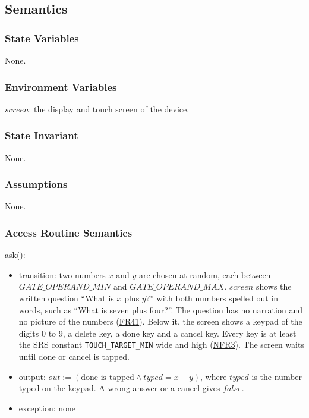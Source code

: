 \documentclass[10pt, titlepage]{article}
\newcommand{\srsurl}{https://team-hindsight.github.io/ophthamology-game/SRS/SRS.pdf}
\newcommand{\srsitemref}[2]{\href{\srsurl\#nameddest=#1}{#2}}
\newcommand{\T}[1]{\mathit{#1}}          %
\newcommand{\out}{\mathit{out}}
\newcommand{\false}{\mathit{false}}
\begin{document}
\subsection{Semantics}

\subsubsection{State Variables}

None.

\subsubsection{Environment Variables}

$\T{screen}$: the display and touch screen of the device.

\subsubsection{State Invariant}

None.

\subsubsection{Assumptions}

None.

\subsubsection{Access Routine Semantics}

\noindent ask():
\begin{itemize}
\item transition: two numbers $x$ and $y$ are chosen at random, each between
  $\T{GATE\_OPERAND\_MIN}$ and $\T{GATE\_OPERAND\_MAX}$. $\T{screen}$ shows the
  written question ``What is $x$ plus $y$?'' with both numbers spelled out in
  words, such as ``What is seven plus four?''. The question has no narration
  and no picture of the numbers (\srsitemref{FR_ParentGate}{FR41}). Below it,
  the screen shows a keypad of the digits 0 to 9, a delete key, a done key and
  a cancel key. Every key is at least the SRS constant \texttt{TOUCH\_TARGET\_MIN} wide and high
  (\srsitemref{NFR_TouchTarget}{NFR3}). The screen waits until done or cancel
  is tapped.
\item output: $\out := (\text{done is tapped} \wedge \T{typed} = x + y)$,
  where $\T{typed}$ is the number typed on the keypad. A wrong answer or a
  cancel gives $\false$.
\item exception: none
\end{itemize}
\end{document}
